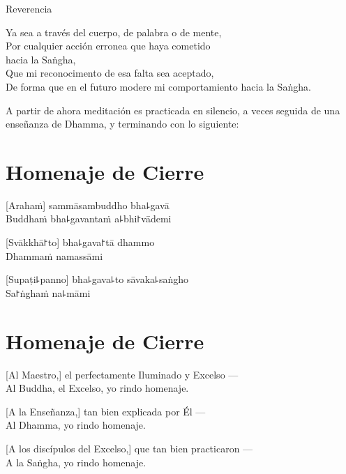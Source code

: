 \enlargethispage{2\baselineskip}

\vfill

\begin{instruction}
  Reverencia
\end{instruction}

Ya sea a través del cuerpo, de palabra o de mente,\\
Por cualquier acción erronea que haya cometido\\
\vin hacia la Saṅgha,\\
Que mi reconocimento de esa falta sea aceptado,\\
De forma que en el futuro modere mi comportamiento hacia la Saṅgha.

\begin{instruction}
  A partir de ahora meditación es practicada en silencio, a veces seguida de una enseñanza de Dhamma, y terminando con lo siguiente:
\end{instruction}

\clearpage

\chapter*{Homenaje de Cierre}

\delegateSetUseNext

[Arahaṁ] sammāsambuddho bha꜕gavā\\
Buddhaṁ bha꜕gavantaṁ a꜕bhi꜓vādemi 

[Svākkhā꜓to] bha꜕gava꜓tā dhammo\\
Dhammaṁ namassāmi 

[Supaṭi꜕panno] bha꜕gava꜕to sāvaka꜕saṅgho\\
Sa꜓ṅghaṁ na꜕māmi 

\clearpage

\chapter{Homenaje de Cierre}

[Al Maestro,] el perfectamente Iluminado y Excelso ---\\
Al Buddha, el Excelso, yo rindo homenaje. 

[A la Enseñanza,] tan bien explicada por Él ---\\
Al Dhamma, yo rindo homenaje. 

[A los discípulos del Excelso,] que tan bien practicaron ---\\
A la Saṅgha, yo rindo homenaje. 
